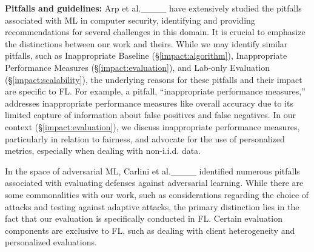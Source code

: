 \noindent\textbf{Pitfalls and guidelines: }
Arp et al.____ have extensively studied the pitfalls associated with ML in computer security, identifying and providing recommendations for several challenges in this domain. It is crucial to emphasize the distinctions between our work and theirs. While we may identify similar pitfalls, such as Inappropriate Baseline (\S\ref{impact:algorithm}), Inappropriate Performance Measures (\S\ref{impact:evaluation}), and Lab-only Evaluation (\S\ref{impact:scalability}), the underlying reasons for these pitfalls and their impact are specific to FL. 
For example, a pitfall, ``inappropriate performance measures,'' addresses inappropriate performance measures like overall accuracy due to its limited capture of information about false positives and false negatives. In our context (\S\ref{impact:evaluation}), we discuss inappropriate performance measures, particularly in relation to fairness, and advocate for the use of personalized metrics, especially when dealing with non-i.i.d. data.

In the space of adversarial ML, Carlini et al.____ identified numerous pitfalls associated with evaluating defenses against adversarial learning. While there are some commonalities with our work, such as considerations regarding the choice of attacks and testing against adaptive attacks, the primary distinction lies in the fact that our evaluation is specifically conducted in FL. Certain evaluation components are exclusive to FL, such as dealing with client heterogeneity and personalized evaluations.

